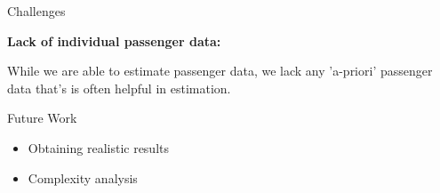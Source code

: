 \documentclass[handout]{beamer}
\begin{document}


\begin{frame}{Challenges}

    \textbf{Lack of individual passenger data:}\vspace{5mm}

    While we are able to estimate passenger data, we lack any 'a-priori' passenger data that's is often helpful in estimation.
\end{frame}

\begin{frame}{Future Work}
    \begin{itemize}
        \item Obtaining realistic results
        \item Complexity analysis
    \end{itemize}
\end{frame}







        
        
        
\end{document}
